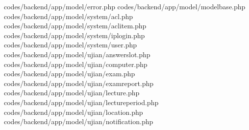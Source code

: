 codes/backend/app/model/error.php
codes/backend/app/model/modelbase.php
codes/backend/app/model/system/acl.php
codes/backend/app/model/system/aclitem.php
codes/backend/app/model/system/iplogin.php
codes/backend/app/model/system/user.php
codes/backend/app/model/ujian/answerslot.php
codes/backend/app/model/ujian/computer.php
codes/backend/app/model/ujian/exam.php
codes/backend/app/model/ujian/examreport.php
codes/backend/app/model/ujian/lecture.php
codes/backend/app/model/ujian/lectureperiod.php
codes/backend/app/model/ujian/location.php
codes/backend/app/model/ujian/notification.php
